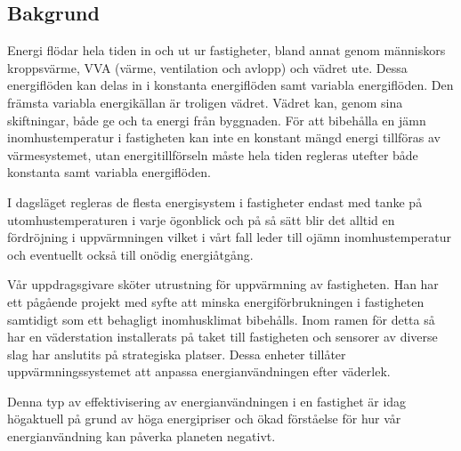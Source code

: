 \subsection{Bakgrund}

Energi flödar hela tiden in och ut ur fastigheter, bland annat genom människors kroppsvärme, VVA (värme, ventilation och avlopp) och vädret ute. Dessa energiflöden kan delas in i konstanta energiflöden samt variabla energiflöden. Den främsta variabla energikällan är troligen vädret. Vädret kan, genom sina skiftningar, både ge och ta energi från byggnaden. För att bibehålla en jämn inomhustemperatur i fastigheten kan inte en konstant mängd energi tillföras av värmesystemet, utan energitillförseln måste hela tiden regleras utefter både konstanta samt variabla energiflöden.

I dagsläget regleras de flesta energisystem i fastigheter endast med tanke på utomhustemperaturen i varje ögonblick och på så sätt blir det alltid en fördröjning i uppvärmningen vilket i vårt fall leder till ojämn inomhustemperatur och eventuellt också till onödig energiåtgång.

Vår uppdragsgivare sköter utrustning för uppvärmning av fastigheten. Han har ett pågående projekt med syfte att minska energiförbrukningen i fastigheten samtidigt som ett behagligt inomhusklimat bibehålls. Inom ramen för detta så har en väderstation installerats på taket till fastigheten och sensorer av diverse slag har anslutits på strategiska platser.  Dessa enheter tillåter uppvärmningssystemet att anpassa energianvändningen efter väderlek.

Denna typ av effektivisering av energianvändningen i en fastighet är idag högaktuell på grund av höga energipriser och ökad förståelse för hur vår energianvändning kan påverka planeten negativt.

